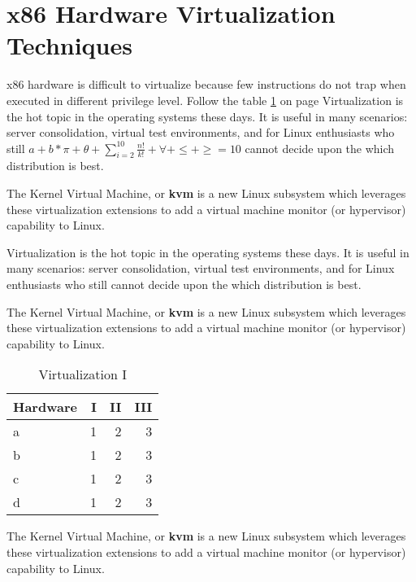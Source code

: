 %
 \section{x86 Hardware Virtualization Techniques}
  x86 hardware is difficult to virtualize because few instructions\cite{Zweben}
  do not trap when executed in different privilege level. Follow the table \ref{table:virtualization 1} on page \pageref{table:virtualization 1}
  \noindent Virtualization is the hot topic in the operating systems 
  these days. It is useful in many scenarios: server consolidation,
  virtual test environments, and for Linux enthusiasts who
  still \begin{math}
          a + b * \pi + \theta + \sum\limits_{i=2}^{10}\frac{n!}{k!} + \forall + \leq + \geq =10
        \end{math}
 cannot decide upon the which distribution is best.
  
  
  
  \noindent The Kernel Virtual Machine, or \textbf{kvm} is a new Linux
  subsystem which leverages these virtualization extensions
  to add a virtual machine monitor (or hypervisor) capability to Linux.
  
  \noindent Virtualization is the hot topic in the operating systems 
  these days. It is useful in many scenarios: server consolidation,
  virtual test environments, and for Linux enthusiasts who
  still cannot decide upon the which distribution is best.
  
  \noindent The Kernel Virtual Machine, or \textbf{kvm} is a new Linux
  subsystem which leverages these virtualization extensions
  to add a virtual machine monitor (or hypervisor) capability to Linux.
  
 \begin{table}[ht]
  \centering
  \begin{tabular}{l r r r}
  \hline
  Hardware & I & II & III\\[0.5ex]
  \hline
  a & 1 & 2 & 3\\
  b & 1 & 2 & 3\\
  c & 1 & 2 & 3\\
  d & 1 & 2 & 3\\
  \hline
  \end{tabular}
  \caption{Virtualization I}
  \label{table:virtualization 1}
 \end{table}

  \noindent The Kernel Virtual Machine\cite{HK}, or \textbf{kvm} is a new Linux
  subsystem which leverages these virtualization extensions
  to add a virtual machine monitor (or hypervisor) capability to Linux.
  
